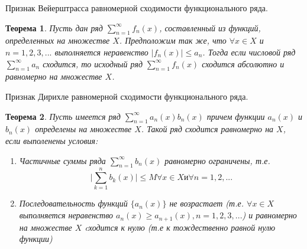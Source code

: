 \documentclass[12pt, a4paper]{article}
\newtheorem{thm}{Теорема}
\newenvironment{field}{}{\newpage}
\newif\ifnote
\newenvironment{note}{\notetrue}{\notefalse}
\begin{document}
\begin{note}
\begin{field}
Признак Вейерштрасса равномерной сходимости функционального ряда.
\end{field}
\begin{field}
\begin{thm}
	Пусть дан ряд $\sum\limits_{n=1}^{\infty}f_n(x)$, составленный из функций, определенных на множестве $X$. Предположим так же, что $\forall x \in X$ и $n = 1, 2, 3, ...$ выполняется неравенство $\mid f_n(x) \mid \leq a_n$. Тогда если числовой ряд $\sum\limits_{n=1}^{\infty}a_n$ сходится, то исходный ряд $\sum\limits_{n=1}^{\infty}f_n(x)$ сходится абсолютно и равномерно на множестве $X$.
\end{thm}

\end{field}
\end{note}

\begin{note}
\begin{field}
Признак Дирихле равномерной сходимости функционального ряда.
\end{field}
\begin{field}
\begin{thm}
	Пусть имеется ряд $\sum\limits_{n=1}^{\infty}a_n(x)b_n(x)$ причем функции $a_n(x)$ и $b_n(x)$ определены на множестве $X$. Такой ряд сходится равномерно на $X$, если выполенены условия:
	\begin{enumerate}
		\item{Частичные суммы ряда $\sum\limits_{n=1}^{\infty}b_n(x)$ равномерно ограничены, т.е.
		\[
			\mid\sum\limits_{k=1}^{n}b_k(x)\mid \leq M \forall x \in X \text{и} \forall n = 1, 2, ...
		\] }
		\item{Последовательность функций $\{a_n(x)\}$ не возрастает (т.е. $\forall x \in X$ выполняется неравенство $a_n(x)  \geq  a_{n+1}(x), n = 1, 2, 3, ...$) и равномерно на множестве $X$ cходится к нулю (т.е к тождественно равной нулю функции)}
	\end{enumerate}
\end{thm}


\end{field}
\end{note}
\end{document}
